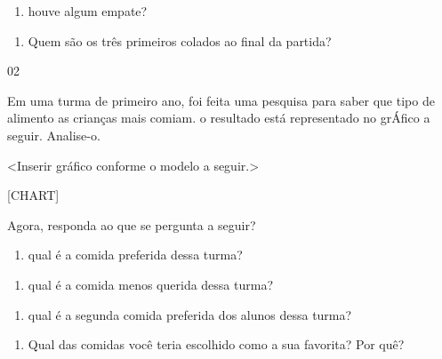 \begin{enumerate}
\def\labelenumi{\Alph{enumi})}
\item
  houve algum empate?
\end{enumerate}


\begin{enumerate}
\def\labelenumi{\Alph{enumi})}
\item
  Quem são os três primeiros colados ao final da partida?
\end{enumerate}


\num{02}

Em uma turma de primeiro ano, foi feita uma pesquisa para saber que tipo de alimento as
crianças mais comiam. o resultado está representado no grÁfico a seguir. Analise-o.

\textless{}Inserir gráfico conforme o modelo a seguir.\textgreater{}

{{[}CHART{]}}

Agora, responda ao que se pergunta a seguir?

\begin{enumerate}
\def\labelenumi{\Alph{enumi})}
\item
  qual é a comida preferida dessa turma?
\end{enumerate}


\begin{enumerate}
\def\labelenumi{\Alph{enumi})}
\item
  qual é a comida menos querida dessa turma?
\end{enumerate}


\begin{enumerate}
\def\labelenumi{\Alph{enumi})}
\item
  qual é a segunda comida preferida dos alunos dessa turma?
\end{enumerate}


\begin{enumerate}
\def\labelenumi{\Alph{enumi})}
\item
  Qual das comidas você teria escolhido como a sua favorita? Por quê?
\end{enumerate}

